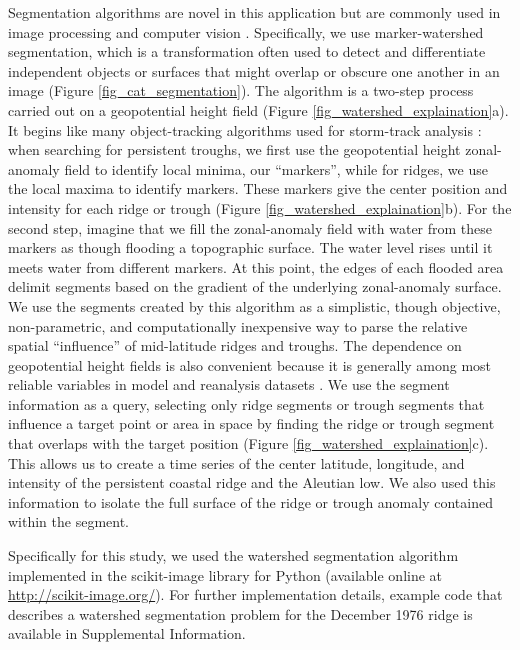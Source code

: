 \documentclass[final, double]{ua-thesis}
\begin{document}
Segmentation algorithms are novel in this application but are commonly used in image processing and computer vision \citep{2digabel_iterative_1978, 2vincent_watersheds_1991, 2dougherty_morphological_1993, 2cousty_watershed_2009}. Specifically, we use marker-watershed segmentation, which is a transformation often used to detect and differentiate independent objects or surfaces that might overlap or obscure one another in an image (Figure \ref{fig_cat_segmentation}). The algorithm is a two-step process carried out on a geopotential height field (Figure \ref{fig_watershed_explaination}a). It begins like many object-tracking algorithms used for storm-track analysis \citep[e.g., ][]{2lambert_cyclone_1988, 2murray_numerical_1991, 2hodges_general_1994, 2hoskins_new_2002}: when searching for persistent troughs, we first use the geopotential height zonal-anomaly field to identify local minima, our ``markers'', while for ridges, we use the local maxima to identify markers. These markers give the center position and intensity for each ridge or trough (Figure \ref{fig_watershed_explaination}b). For the second step, imagine that we fill the zonal-anomaly field with water from these markers as though flooding a topographic surface. The water level rises until it meets water from different markers. At this point, the edges of each flooded area delimit segments based on the gradient of the underlying zonal-anomaly surface. We use the segments created by this algorithm as a simplistic, though objective, non-parametric, and computationally inexpensive way to parse the relative spatial ``influence'' of mid-latitude ridges and troughs. The dependence on geopotential height fields is also convenient because it is generally among most reliable variables in model and reanalysis datasets \citep{2kalnay_ncep/ncar_1996}. We use the segment information as a query, selecting only ridge segments or trough segments that influence a target point or area in space by finding the ridge or trough segment that overlaps with the target position (Figure \ref{fig_watershed_explaination}c). This allows us to create a time series of the center latitude, longitude, and intensity of the persistent coastal ridge and the Aleutian low. We also used this information to isolate the full surface of the ridge or trough anomaly contained within the segment.

Specifically for this study, we used the watershed segmentation algorithm implemented in the scikit-image library for Python (available online at \url{http://scikit-image.org/}). For further implementation details, example code that describes a watershed segmentation problem for the December 1976 ridge is available in Supplemental Information.
\end{document}
